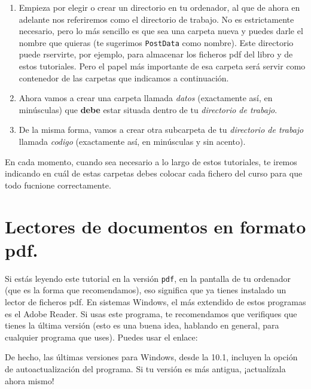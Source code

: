 \documentclass[10pt,a4paper]{article}\usepackage[]{graphicx}\usepackage[]{color}
\newcounter {cont01}
\begin{document}
\begin{enumerate}
  \item Empieza por elegir o crear un directorio en tu ordenador, al que de ahora en adelante nos referiremos como el {\sf directorio de trabajo}. No es estrictamente necesario, pero lo más sencillo es que sea una carpeta nueva y puedes darle el nombre que quieras (te sugerimos {\tt PostData} como nombre). Este directorio puede rservirte, por ejemplo, para almacenar los ficheros pdf del libro y de estos tutoriales. Pero el papel más importante de esa carpeta será servir como contenedor de las carpetas que indicamos a continuación.
  \item Ahora vamos a crear una carpeta llamada {\em datos} (exactamente así, en minúsculas) que {\bf debe} estar situada dentro de tu {\em directorio de trabajo}.  
  \item De la misma forma, vamos a crear otra subcarpeta de tu {\em directorio de trabajo} llamada {\em codigo} (exactamente así, en minúsculas y sin acento).
\end{enumerate}

En cada momento, cuando sea necesario a lo largo de estos tutoriales, te iremos indicando en cuál de estas carpetas debes colocar cada fichero del curso para que todo fucnione correctamente.   

\section{Lectores de documentos en formato pdf.}
\label{tut00:sec:LectoresPdf}

Si estás leyendo este tutorial en la versión {\tt pdf}, en la pantalla de tu ordenador (que es la
forma que recomendamos), eso significa que ya tienes instalado un lector de ficheros pdf. En
sistemas Windows, el más extendido de estos programas es el Adobe Reader. Si usas este programa, te
recomendamos que verifiques que tienes la última versión (esto es una buena idea, hablando en
general, para cualquier programa que uses). Puedes usar el enlace:
\begin{center}
\end{center}
De hecho, las últimas versiones para Windows, desde la 10.1, incluyen la opción de
autoactualización del programa. Si tu versión es más antigua, ¡actualízala ahora mismo!
\end{document}
